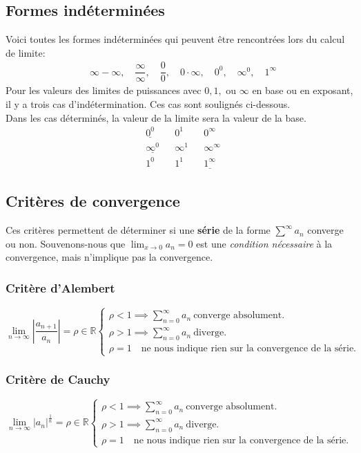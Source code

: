 \documentclass{article}
\begin{document}
\subsection{Formes indéterminées}
Voici toutes les formes indéterminées qui peuvent être rencontrées lors du calcul de limite:
\begin{align*}
	&\infty - \infty, \quad \dfrac{\infty}{\infty}, \quad \dfrac{0}{0}, \quad 0 \cdot \infty, \quad 0^0, \quad \infty^0, \quad 1^\infty
\end{align*}
Pour les valeurs des limites de puissances avec \(0, 1, \text{ ou } \infty\) en base ou en exposant, il y a trois cas d'indétermination. Ces cas sont soulignés ci-dessous. \\ Dans les cas déterminés, la valeur de la limite sera la valeur de la base.
\begin{align*}
	&\underline{0^0	}		& &0^1					& &0^\infty \\
	&\underline{\infty^0}	& &\infty^1				& &\infty^\infty \\
	&1^0						& &1^1					& &\underline{1^\infty}
\end{align*}

\subsection{Critères de convergence}
Ces critères permettent de déterminer si une \textbf{série} de la forme \(\sum^\infty a_n\) converge ou non. Souvenons-nous que \(\lim_{x \to 0} a_n = 0\) est une \emph{condition nécessaire} à la convergence, mais n'implique pas la convergence. \\

\subsubsection{Critère d'Alembert}
\begin{equation*}
	\lim_{n \to \infty} \left | \dfrac{a_{n+1}}{a_n} \right | = \rho \in \mathbb{R} 
	\begin{cases}
		\rho < 1 \implies \sum_{n=0}^\infty a_n \ \text{converge absolument.} \\
		\rho > 1 \implies \sum_{n=0}^\infty a_n \ \text{diverge.} \\
		\rho = 1 \quad \text{ne nous indique rien sur la convergence de la série.}
	\end{cases}
\end{equation*}

\subsubsection{Critère de Cauchy}
\begin{equation*}
	\lim_{n \to \infty} \left | a_n \right |^{\frac1n} = \rho \in \mathbb{R}
	\begin{cases}
		\rho < 1 \implies \sum_{n=0}^\infty a_n \ \text{converge absolument.} \\
		\rho > 1 \implies \sum_{n=0}^\infty a_n \ \text{diverge.} \\
		\rho = 1 \quad \text{ne nous indique rien sur la convergence de la série.}
	\end{cases}
\end{equation*}
\end{document}

